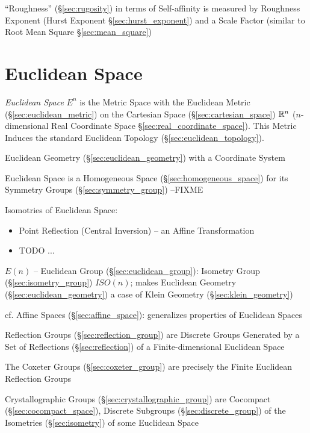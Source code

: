 ``Roughness'' (\S\ref{sec:rugosity}) in terms of Self-affinity is measured by
Roughness Exponent (Hurst Exponent \S\ref{sec:hurst_exponent}) and a Scale
Factor (similar to Root Mean Square \S\ref{sec:mean_square})



\section{Euclidean Space}\label{sec:euclidean_space}

\emph{Euclidean Space} $\xspace{E}^n$ is the Metric Space with the Euclidean
Metric (\S\ref{sec:euclidean_metric}) on the Cartesian Space
(\S\ref{sec:cartesian_space}) $\mathbb{R}^n$ ($n$-dimensional Real Coordinate Space
\S\ref{sec:real_coordinate_space}). This Metric Induces the standard Euclidean
Topology (\S\ref{sec:euclidean_topology}).

Euclidean Geometry (\S\ref{sec:euclidean_geometry}) with a Coordinate System

Euclidean Space is a Homogeneous Space (\S\ref{sec:homogeneous_space}) for its
Symmetry Groups (\S\ref{sec:symmetry_group}) --FIXME

Isomotries of Euclidean Space:
\begin{itemize}
  \item Point Reflection (Central Inversion) -- an Affine Transformation
  \item TODO
  ...
\end{itemize}

$E(n)$ -- Euclidean Group (\S\ref{sec:euclidean_group}): Isometry Group
(\S\ref{sec:isometry_group}) $ISO(n)$; makes Euclidean Geometry
(\S\ref{sec:euclidean_geometry}) a case of Klein Geometry
(\S\ref{sec:klein_geometry})

cf. Affine Spaces (\S\ref{sec:affine_space}): generalizes properties
of Euclidean Spaces

Reflection Groups (\S\ref{sec:reflection_group}) are Discrete Groups Generated
by a Set of Reflections (\S\ref{sec:reflection}) of a Finite-dimensional
Euclidean Space

The Coxeter Groups (\S\ref{sec:coxeter_group}) are precisely the Finite
Euclidean Reflection Groups

Crystallographic Groups (\S\ref{sec:crystallographic_group}) are Cocompact
(\S\ref{sec:cocompact_space}), Discrete Subgroups (\S\ref{sec:discrete_group})
of the Isometries (\S\ref{sec:isometry}) of some Euclidean Space



